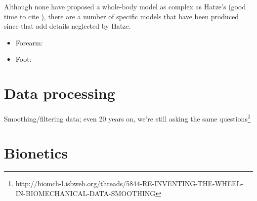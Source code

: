 \documentclass[a4paper]{article}
\begin{document}
Although none have proposed a whole-body model as complex as Hatze's (good time to cite \textcite{kwon1996-jab}), there are a number of specific models that have been produced since that add details neglected by Hatze.
\begin{itemize}
  \item Forearm: \textcite{reich2000-biomech}
  \item Foot: \textcite{dillon2001-thesis}
\end{itemize}

\section{Data processing}

Smoothing/filtering data; even 20 years on, we're still asking the same questions\footnote{http://biomch-l.isbweb.org/threads/5844-RE-INVENTING-THE-WHEEL-IN-BIOMECHANICAL-DATA-SMOOTHING}

\section{Bionetics}
\end{document}
